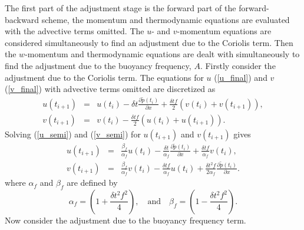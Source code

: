 \documentclass[times]{qjrms4}
\begin{document}
The first part of the adjustment stage is the forward part of the forward-backward scheme,
the momentum and thermodynamic equations are evaluated with the advective terms omitted.
% 
The $u$- and $v$-momentum equations are considered simultaneously to find an adjustment due to the 
Coriolis term. Then the $w$-momentum and thermodynamic equations are dealt with simultaneously 
to find the adjustment due to the buoyancy frequency, $A$. 
%
Firstly consider the adjustment due to the Coriolis term. 
The equations for $u$ (\ref{u_final}) and $v$ (\ref{v_final}) with advective terms omitted are
discretized as
  \begin{eqnarray}
     u(t_{i+1}) &=& u(t_i) - \delta t \frac{\partial \tilde{p}(t_i)}{\partial x} + 
                 \frac {\delta t f }{2} \left( v(t_i) + v(t_{i+1}) \right),  \label{u_semi}  \\
    v(t_{i+1}) &=& v(t_i) - \frac {\delta t f }{2} \left( u(t_i) + u(t_{i+1}) \right).
    \label{v_semi}
  \end{eqnarray}
Solving (\ref{u_semi}) and (\ref{v_semi}) for $u(t_{i+1})$ and $v(t_{i+1})$ gives
%
\begin{eqnarray} 
u(t_{i+1}) &=& \frac{\beta_f}{\alpha_f} u(t_i) - \frac {\delta t}{\alpha_f} 
\frac{\partial \tilde{p}(t_i)}{\partial x} + \frac{\delta t f}{\alpha_f} v(t_i), \label{u_semi_5} \\
 v(t_{i+1})&=& \frac{\beta_f}{\alpha_f} v(t_i) - \frac{\delta t f}{\alpha_f} u(t_i) +
 \frac {\delta t^2 f }{2 \alpha_f} \frac{\partial \tilde{p}(t_i)}{\partial x}. 
 \label{v_semi_5}
\end{eqnarray}
where $\alpha_f$ and $\beta_f$ are defined by
\begin{equation}\label{def_alpha_beta_f}
\alpha_f = \left( 1 + \frac{\delta t^2 f^2}{4} \right), \quad \mbox{and} \quad
\beta_f = \left( 1 - \frac{\delta t^2 f^2}{4} \right).
\end{equation}
%
Now consider the adjustment due to the buoyancy frequency term. 
\end{document}
